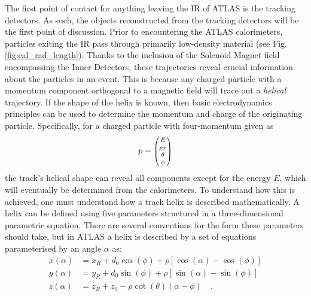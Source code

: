             The first point of contact for anything leaving the IR of ATLAS is the tracking detectors.
            As such, the objects reconstructed from the tracking detectors will be the first point of discussion.
            Prior to encountering the ATLAS calorimeters,
                particles exiting the IR pass through primarily low-density material (see Fig. \ref{fig:cal_rad_length}).
            Thanks to the inclusion of the Solenoid Magnet field encompassing the Inner Detectors,
                these trajectories reveal crucial information about the particles in an event.
            This is because any charged particle with a momentum component orthogonal to a magnetic field
                will trace out a \textit{helical} trajectory.
            If the shape of the helix is known, then basic electrodynamics principles can be used to determine the
                momentum and charge of the originating particle.
            Specifically, for a charged particle with four-momentum given as 
            \begin{equation}
            p = \minimatrix{E \\ p_T \\ \theta \\ \phi}
            \end{equation}
            the track's helical shape can reveal all components except for the energy $E$,
                which will eventually be determined from the calorimeters.
            To understand how this is achieved, one must understand how a track helix is described mathematically.
            A helix can be defined using five parameters structured in a three-dimensional parametric equation.
            There are several conventions for the form these parameters should take,
                but in ATLAS a helix is described by a set of equations parameterised by an angle $\alpha$ as\cite{thesis_giacinto}:
            \begin{equation} \begin{split}
                x(\alpha) &= x_R + d_0 \cos(\phi) + \rho \left[ \cos(\alpha) - \cos(\phi) \right] \\
                y(\alpha) &= y_R + d_0 \sin(\phi) + \rho \left[ \sin(\alpha) - \sin(\phi) \right] \\
                z(\alpha) &= z_R + z_0 - \rho \cot(\theta) (\alpha - \phi)
                \quad.
            \end{split} \end{equation}


